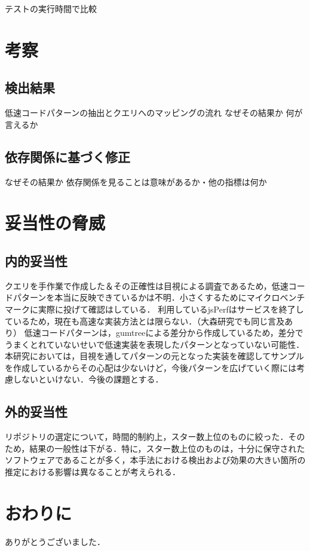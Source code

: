 \documentclass[submit,techrep,noauthor]{ipsj}
\begin{document}
テストの実行時間で比較


\section{考察}
\label{sec5:format}




\subsection{検出結果}

低速コードパターンの抽出とクエリへのマッピングの流れ
なぜその結果か
何が言えるか

\subsection{依存関係に基づく修正}

なぜその結果か
依存関係を見ることは意味があるか・他の指標は何か

\section{妥当性の脅威}
\label{sec6:format}

\subsection{内的妥当性}
クエリを手作業で作成した＆その正確性は目視による調査であるため，低速コードパターンを本当に反映できているかは不明．小さくするためにマイクロベンチマークに実際に投げて確認はしている．
利用しているjsPerfはサービスを終了しているため，現在も高速な実装方法とは限らない．（大森研究でも同じ言及あり）
低速コードパターンは，gumtreeによる差分から作成しているため，差分でうまくとれていないせいで低速実装を表現したパターンとなっていない可能性．本研究においては，目視を通してパターンの元となった実装を確認してサンプルを作成しているからその心配は少ないけど，今後パターンを広げていく際には考慮しないといけない．今後の課題とする．

\subsection{外的妥当性}
リポジトリの選定について，時間的制約上，スター数上位のものに絞った．そのため，結果の一般性は下がる．特に，スター数上位のものは，十分に保守されたソフトウェアであることが多く，本手法における検出および効果の大きい箇所の推定における影響は異なることが考えられる．

\section{おわりに}
\label{sec7:format}


\begin{acknowledgment}
ありがとうございました．
\end{acknowledgment}





\end{document}
